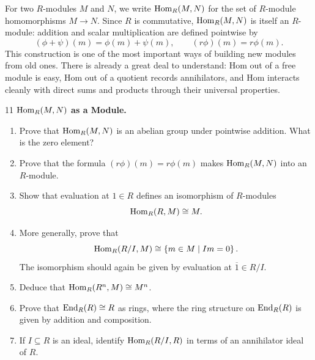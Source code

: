 \documentclass[Notebook.tex]{subfiles}
\begin{document}
    \newpage 

    \hrulefill

    For two $R$-modules $M$ and $N$, we write $\operatorname{Hom}_R(M,N)$ for the set of $R$-module homomorphisms $M\to N$. Since $R$ is commutative, $\operatorname{Hom}_R(M,N)$ is itself an $R$-module: addition and scalar multiplication are defined pointwise by
    \[
    (\phi+\psi)(m)=\phi(m)+\psi(m),
    \qquad
    (r\phi)(m)=r\phi(m).
    \]
    This construction is one of the most important ways of building new modules from old ones. There is already a great deal to understand: Hom out of a free module is easy, Hom out of a quotient records annihilators, and Hom interacts cleanly with direct sums and products through their universal properties.

    \hrulefill

    \newpage 
    
    \begin{problem}{11}
        \textbf{$\operatorname{Hom}_R(M,N)$ as a Module.}
        \begin{enumerate}
        \item Prove that $\operatorname{Hom}_R(M,N)$ is an abelian group under pointwise addition. What is the zero element?
        \item Prove that the formula $(r\phi)(m)=r\phi(m)$ makes $\operatorname{Hom}_R(M,N)$ into an $R$-module.
        \item Show that evaluation at $1\in R$ defines an isomorphism of $R$-modules
        \[
        \operatorname{Hom}_R(R,M)\cong M.
        \]
        \item More generally, prove that
        \[
        \operatorname{Hom}_R(R/I,M)\cong \left\{m\in M\mid Im=0\right\}.
        \]
        The isomorphism should again be given by evaluation at $\overline{1}\in R/I$.
        \item Deduce that $\operatorname{Hom}_R(R^n,M)\cong M^n$.
        \item Prove that $\operatorname{End}_R(R)\cong R$ as rings, where the ring structure on $\operatorname{End}_R(R)$ is given by addition and composition.
        \item If $I\subseteq R$ is an ideal, identify $\operatorname{Hom}_R(R/I,R)$ in terms of an annihilator ideal of $R$.
        \end{enumerate}
    \end{problem}
\end{document}

